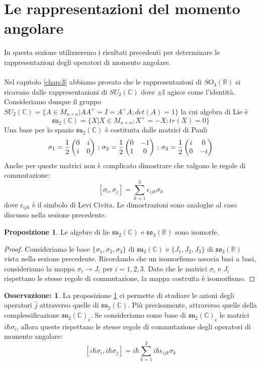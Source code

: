 \documentclass[12pt,a4paper]{report}
\theoremstyle{definition}
\theoremstyle{Theorem}
\newtheorem{Prop}[Def]{Proposizione}
\theoremstyle{definition}
\theoremstyle{definition}
\theoremstyle{definition}
\newtheorem{Obs}[Def]{Osservazione:}
\begin{document}
\section{Le rappresentazioni del momento angolare}
In questa sezione utilizzeremo i risultati precedenti per determinare le rappresentazioni degli operatori di momento angolare.\\
\\
Nel capitolo \ref{chap:3} abbiamo provato che le rappresentazioni di $SO_3(\mathbb{R})$ si ricavano dalle rappresentazioni di $SU_2(\mathbb{C})$ dove $\pm\mathbb{I}$ agisce come l'identità.
Consideriamo dunque il gruppo $SU_2(\mathbb{C})=\{A\in M_{n\times n}|AA^{+}=I=A^{+}A;det(A)=1\}$ la cui algebra di Lie è $$\mathfrak{su_2(\mathbb{C})}=\{X|X\in M_{n\times n} ;X^{+}=-X;tr(X)=0\}$$
Una base per lo spazio $\mathfrak{su_2(\mathbb{C})}$ è costituita dalle matrici di Pauli
$$
\sigma_1={1\over2}\begin{pmatrix}
	0 &i\\
	i &0\\
\end{pmatrix}\,;\,
\sigma_2={1\over2}\begin{pmatrix}
	0 &-1\\
	1 &0\\
\end{pmatrix}\,;\,
\sigma_3={1\over2}\begin{pmatrix}
	i &0\\
	0 &-i\\
\end{pmatrix}
$$
Anche per queste matrici non è complicato dimostrare che valgono le regole di commutazione:
$$[\sigma_i,\sigma_j]=\sum_{k=1}^{3}\epsilon_{ijk}\sigma_k$$ 
dove $\epsilon_{ijk}$ è il simbolo di Levi Civita. Le dimostrazioni sono analoghe al caso discusso nella sezione precedente.
\begin{Prop} \label{Prop:4.3.1}
	Le algebre di lie $\mathfrak{su_2(\mathbb{C})}$ e $\mathfrak{so_3}(\mathbb{R})$ sono isomorfe.
\end{Prop}
\begin{proof}
	Consideriamo le base $\{\sigma_1,\sigma_2,\sigma_3\}$ di $\mathfrak{su_2(\mathbb{C})}$ e $\{J_1,J_2,J_3\}$ di $\mathfrak{so_3}(\mathbb{R})$ vista nella sezione precedente. Ricordando che un isomorfismo associa basi a basi, consideriamo la mappa
	$\sigma_i\rightarrow J_i$ per $i=1,2,3$. Dato che le matrici $\sigma_i$ e $J_i$ rispettano le stesse regole di commutazione, la mappa costruita è isomorfismo.
\end{proof}
\begin{Obs}
	La proposizione \ref{Prop:4.3.1} ci permette di studiare le azioni degli operatori $\hat{j}$ attraverso quelle di $\mathfrak{su_2(\mathbb{C})}$. Più precisamente, attraverso quelle della complessificazione $\mathfrak{su_2(\mathbb{C})_c}$. Se consideriamo come base di $\mathfrak{su_2(\mathbb{C})_c}$ le matrici $i\hbar\sigma_i$, allora queste rispettano le stesse regole di commutazione degli operatori di momento angolare:
	$$[i\hbar\sigma_i,i\hbar\sigma_j]=i\hbar\sum_{k=1}^{3}i\hbar\epsilon_{ijk}\sigma_k$$ 
\end{Obs}
\end{document}
